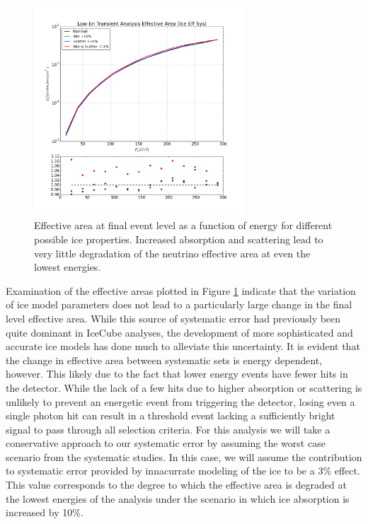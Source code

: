 \documentclass{gatech-thesis}
\begin{document}
\begin{figure}[ht]
  \begin{center}
    \includegraphics[width=0.7\textwidth,keepaspectratio]{LowEnTransient_EffArea_SysNugen_IceEffect_300GeVTrunc.png}
  \end{center}
  \caption{Effective area at final event level as a function of energy for different possible ice properties. Increased absorption and scattering lead to very little degradation of the neutrino effective area at even the lowest energies.}
  \label{fig:IceSysEffArea}
\end{figure}
Examination of the effective areas plotted in Figure \ref{fig:IceSysEffArea} indicate that the variation of ice model parameters does not lead to a particularly large change in the final level effective area. While this source of systematic error had previously been quite dominant in IceCube analyses, the development of more sophisticated and accurate ice models has done much to alleviate this uncertainty. It is evident that the change in effective area between systematic sets is energy dependent, however. This likely due to the fact that lower energy events have fewer hits in the detector. While the lack of a few hits due to higher absorption or scattering is unlikely to prevent an energetic event from triggering the detector, losing even a single photon hit can result in a threshold event lacking a sufficiently bright signal to pass through all selection criteria. For this analysis we will take a conservative approach to our systematic error by assuming the worst case scenario from the systematic studies. In this case, we will assume the contribution to systematic error provided by innacurrate modeling of the ice to be a 3$\%$ effect. This value corresponds to the degree to which the effective area is degraded at the lowest energies of the analysis under the scenario in which ice absorption is increased by 10$\%$.
\end{document}
